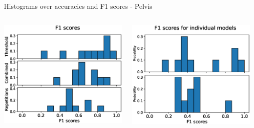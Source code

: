 \begin{frame}[fragile]{Histograms over accuracies and F1 scores - Pelvis}
\begin{columns}
  \includegraphics[width=\textwidth]{files/figs/res/pelvis/f1.eps}

  \includegraphics[width=\textwidth]{files/figs/res/pelvis/f1-ind.eps}
\end{columns}
\end{frame}

